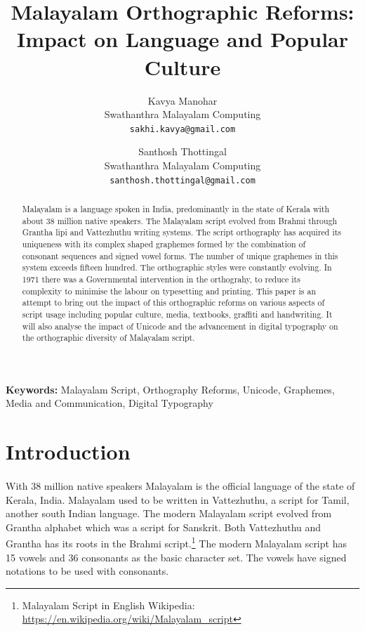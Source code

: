 \documentclass[10pt]{article}
\title{Malayalam Orthographic Reforms: \\Impact on Language and Popular Culture}
\author{Kavya Manohar \\
\small{Swathanthra Malayalam Computing} \\
 {\small {\tt sakhi.kavya@gmail.com}} \\
 \and
 Santhosh Thottingal \\
 \small{Swathanthra Malayalam Computing} \\
 {\small {\tt santhosh.thottingal@gmail.com}}}
\begin{document}
\maketitle

\begin{abstract}

Malayalam is a language spoken in India, predominantly in the state of Kerala with about 38 million native speakers. The Malayalam script evolved from Brahmi through Grantha lipi and Vattezhuthu writing systems. The script orthography has acquired its uniqueness with its complex shaped graphemes formed by the combination of consonant sequences and  signed vowel forms. The number of unique graphemes in this system exceeds fifteen hundred. The orthographic styles were constantly evolving. In 1971 there was a Governmental intervention in the orthograhy, to reduce its complexity to minimise the labour on typesetting and printing. This paper is an attempt to bring out the impact of this orthographic reforms on various aspects of script usage including popular culture, media, textbooks, graffiti and handwriting. It will also analyse the impact of Unicode and the advancement in digital typography on the orthographic diversity of Malayalam script.

\end{abstract}
 \textbf{Keywords:} Malayalam Script, Orthography Reforms, Unicode, Graphemes, Media and Communication, Digital Typography

\section{Introduction}

\paragraph{}

With 38 million native speakers Malayalam is the official language of the state of Kerala, India.  Malayalam used to be written in Vattezhuthu, a script for Tamil, another south Indian language. The modern Malayalam script evolved from Grantha alphabet which was a script for Sanskrit. Both Vattezhuthu and Grantha has its roots in the Brahmi script.\footnote{Malayalam Script in English Wikipedia: \url{https://en.wikipedia.org/wiki/Malayalam_script}} The modern Malayalam script has 15 vowels and 36 consonants as the basic character set. The vowels have signed notations to be used with consonants.
\end{document}

